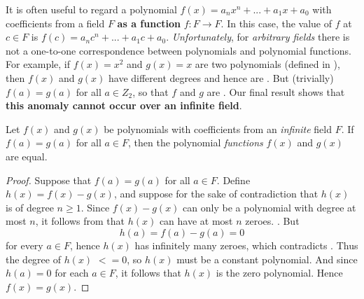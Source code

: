\begin{remark} \label{remark e.7}
It is often useful to regard a polynomial \(f(x) = a_n x^n + ... + a_1 x + a_0\) with coefficients from a field \(F\) \textbf{as a function} \(f: F \to F\).
In this case, the value of \(f\) at \(c \in F\) is \(f(c) = a_n c^n + ... + a_1 c + a_0\).
\emph{Unfortunately}, for \emph{arbitrary fields} there is not a one-to-one correspondence between polynomials and polynomial functions.
For example, if \(f(x) = x^2\) and \(g(x) = x\) are two polynomials  (defined in ),
then \(f(x)\) and \(g(x)\) have different degrees and hence are .
But (trivially) \(f(a) = g(a)\) for all \(a \in Z_2\), so that \(f\) and \(g\) are .
Our final result shows that \textbf{this anomaly cannot occur over an infinite field}.
\end{remark}

\begin{appendix theorem} \label{thm e.10}
Let \(f(x)\) and \(g(x)\) be polynomials with coefficients from an \emph{infinite} field \(F\).
If \(f(a) = g(a)\) for all \(a \in F\), then the polynomial \emph{functions} \(f(x)\) and \(g(x)\) are equal.
\end{appendix theorem}

\begin{proof}
Suppose that \(f(a) = g(a)\) for all \(a \in F\).
Define \(h(x) = f(x) - g(x)\), and suppose for the sake of contradiction that \(h(x)\) is of degree \(n \ge 1\).
Since \(f(x) - g(x)\) can only be a polynomial with degree at most \(n\), it follows from  that \(h(x)\) can have at most \(n\) zeroes. .
But
\[
    h(a) = f(a) - g(a) = 0
\]
for every \(a \in F\), hence \(h(x)\) has infinitely many zeroes, which contradicts .
Thus the degree of \(h(x)\) \(<= 0\), so \(h(x)\) must be a constant polynomial.
And since \(h(a) = 0\) for each \(a \in F\), it follows that \(h(x)\) is the zero polynomial.
Hence \(f(x) = g(x)\).
\end{proof}
